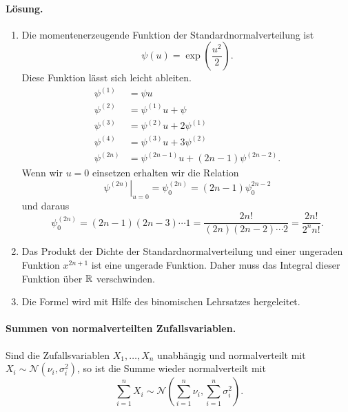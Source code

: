 \paragraph*{Lösung.}
\begin{enumerate}
    \item 
        Die momentenerzeugende Funktion der Standardnormalverteilung ist 
        \begin{equation*}
            \psi(u) = \exp \left( \frac{u^2}{2} \right).
        \end{equation*}
        Diese Funktion lässt sich leicht ableiten. 
        \begin{align*}
            \psi^{(1)} &= \psi u \\
            \psi^{(2)} &= \psi^{(1)} u + \psi \\
            \psi^{(3)} &= \psi^{(2)} u + 2 \psi^{(1)} \\
            \psi^{(4)} &= \psi^{(3)} u + 3 \psi^{(2)} \\
            \psi^{(2n)} &= \psi^{(2n-1)} u + (2n-1) \psi^{(2n-2)}.
        \end{align*}
        Wenn wir $u=0$ einsetzen erhalten wir die Relation
        \begin{equation*}
            \left. \psi^{(2n)} \right|_{u=0}^{} =
            \psi_{0}^{(2n)} = (2n-1)\psi^{2n-2}_{0}
        \end{equation*}
        und daraus
        \begin{equation*}
            \psi_{0}^{(2n)} = (2n-1)(2n-3) \cdots 1 = \frac{ 2n!}{ (2n)(2n-2)\cdots 2  } = \frac{2n!}{ 2^n n!}.
        \end{equation*}
    \item Das Produkt der Dichte der Standardnormalverteilung und einer ungeraden Funktion 
        $x^{2n+1}$ ist eine ungerade Funktion. Daher muss das Integral dieser Funktion über $\mathbb R$
        verschwinden. 
    \item Die Formel wird mit Hilfe des binomischen Lehrsatzes hergeleitet. 
\end{enumerate}


\paragraph{Summen von normalverteilten Zufallsvariablen. }
Sind die Zufallsvariablen $X_1,\ldots,X_n$ unabhängig und normalverteilt
mit $X_i \sim \mathcal N (\nu_i, \sigma_i^2)$, so ist die Summe
wieder normalverteilt mit 
\begin{equation*}
    \sum_{i=1}^{n} X_i \sim 
    \mathcal N \left( \sum_{i=1}^{n} \nu_i, \sum_{i=1}^{n} \sigma_i^2 \right). 
\end{equation*} %

